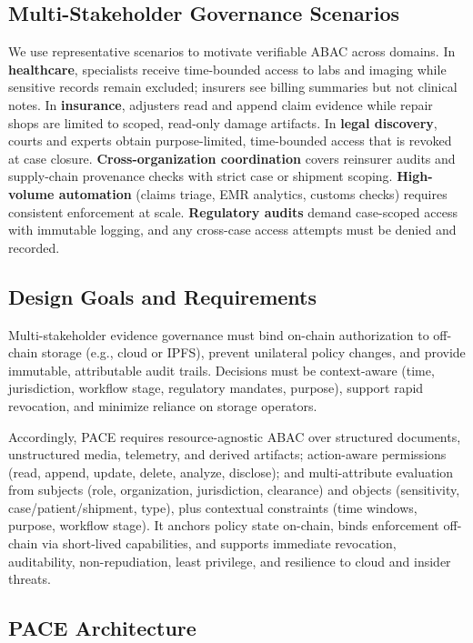 \documentclass[pdflatex,sn-mathphys-num]{sn-jnl}
\begin{document}
\subsection{Multi-Stakeholder Governance Scenarios}

We use representative scenarios to motivate verifiable ABAC across domains. In \textbf{healthcare}, specialists receive time-bounded access to labs and imaging while sensitive records remain excluded; insurers see billing summaries but not clinical notes. In \textbf{insurance}, adjusters read and append claim evidence while repair shops are limited to scoped, read-only damage artifacts. In \textbf{legal discovery}, courts and experts obtain purpose-limited, time-bounded access that is revoked at case closure. \textbf{Cross-organization coordination} covers reinsurer audits and supply-chain provenance checks with strict case or shipment scoping. \textbf{High-volume automation} (claims triage, EMR analytics, customs checks) requires consistent enforcement at scale. \textbf{Regulatory audits} demand case-scoped access with immutable logging, and any cross-case access attempts must be denied and recorded.

\subsection{Design Goals and Requirements}

Multi-stakeholder evidence governance must bind on-chain authorization to off-chain storage (e.g., cloud or IPFS), prevent unilateral policy changes, and provide immutable, attributable audit trails. Decisions must be context-aware (time, jurisdiction, workflow stage, regulatory mandates, purpose), support rapid revocation, and minimize reliance on storage operators.

Accordingly, PACE requires resource-agnostic ABAC over structured documents, unstructured media, telemetry, and derived artifacts; action-aware permissions (read, append, update, delete, analyze, disclose); and multi-attribute evaluation from subjects (role, organization, jurisdiction, clearance) and objects (sensitivity, case/patient/shipment, type), plus contextual constraints (time windows, purpose, workflow stage). It anchors policy state on-chain, binds enforcement off-chain via short-lived capabilities, and supports immediate revocation, auditability, non-repudiation, least privilege, and resilience to cloud and insider threats.

\subsection{PACE Architecture}
\label{sec:architecture}
\end{document}
